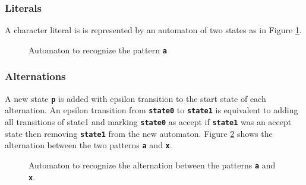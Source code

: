\subsubsection{Literals}
A character literal is is represented by an automaton of two states as in Figure \ref{fig:auto1}.

\begin{figure}[htpb]
\centering
{}
\caption{Automaton to recognize the pattern \texttt{\textbf{a}}}
\label{fig:auto1}
\end{figure}


\subsubsection{Alternations}
A new state \texttt{\textbf{p}} is added with epsilon transition to the start state of each alternation. An epsilon transition from \texttt{\textbf{state0}} to  \texttt{\textbf{state1}} is equivalent to adding all transitions of state1 and marking  \texttt{\textbf{state0}} as accept if  \texttt{\textbf{state1}} was an accept state then removing  \texttt{\textbf{state1}} from the new automaton. Figure \ref{fig:auto2} shows the alternation between the two patterns \texttt{\textbf{a}} and \texttt{\textbf{x}}.

\begin{figure}[htpb]
\centering
{}
\caption{Automaton to recognize the alternation between the patterns \texttt{\textbf{a}} and \texttt{\textbf{x}}.}
\label{fig:auto2}
\end{figure}

